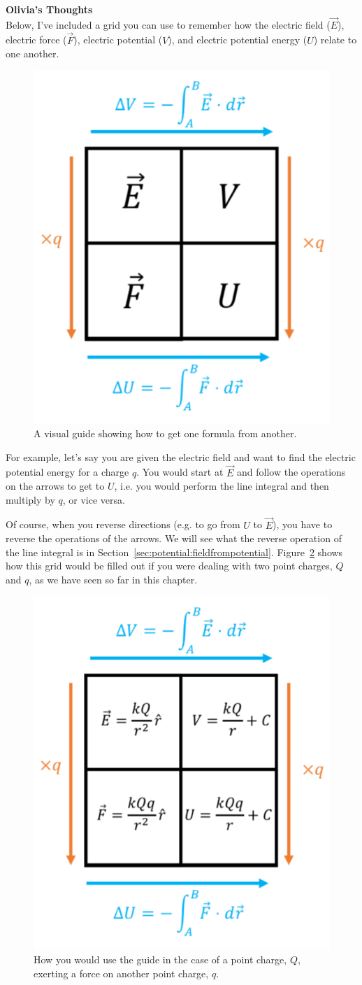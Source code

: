 \begin{framed}
\textbf{Olivia's Thoughts}\\
Below, I've included a grid you can use to remember how the electric field ($\vec E$), electric force ($\vec F$), electric potential ($V$), and electric potential energy ($U$) relate to one another.

\begin{figure}[!htbp]
\centering
\includegraphics[width=0.4\linewidth]{files/eqn_gridcrop-f3d5ae82cbd9e8f530e5625fd7d75deb.png}
\caption[]{A visual guide showing how to get one formula from another.}
\label{fig:potential:eqn_grid}
\end{figure}

For example, let's say you are given the electric field and want to find the electric potential energy for a charge $q$. You would start at $\vec E$ and follow the operations on the arrows to get to $U$, i.e. you would perform the line integral and then multiply by $q$, or vice versa.

Of course, when you reverse directions (e.g. to go from $U$ to $\vec E$), you have to reverse the operations of the arrows. We will see what the reverse operation of the line integral is in Section~\ref{sec:potential:fieldfrompotential}. Figure~\ref{fig:potential:eqn_grid_point} shows how this grid would be filled out if you were dealing with two point charges, $Q$ and $q$, as we have seen so far in this chapter.

\begin{figure}[!htbp]
\centering
\includegraphics[width=0.4\linewidth]{files/eqn_grid_pointcrop-94d3448ac4141a3f995476c79cd2bb7c.png}
\caption[]{How you would use the guide in the case of a point charge, $Q$, exerting a force on another point charge, $q$.}
\label{fig:potential:eqn_grid_point}
\end{figure}
\end{framed}

